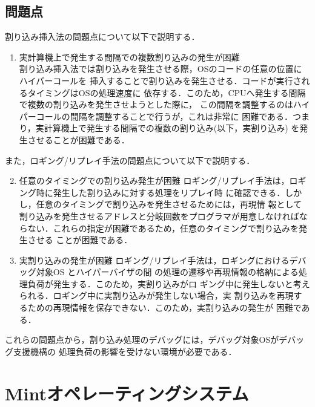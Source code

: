 \documentclass[tanilab-enum]{graduate}
\begin{document}
\section{問題点}
割り込み挿入法の問題点について以下で説明する．
\begin{enumerate}
    \item 実計算機上で発生する間隔での複数割り込みの発生が困難\\
        割り込み挿入法では割り込みを発生させる際，OSのコードの任意の位置にハイパーコールを
        挿入することで割り込みを発生させる．コードが実行されるタイミングはOSの処理速度に
        依存する．このため，CPUへ発生する間隔で複数の割り込みを発生させようとした際に，
        この間隔を調整するのはハイパーコールの間隔を調整することで行うが，これは非常に
        困難である．つまり，実計算機上で発生する間隔での複数の割り込み(以下，実割り込み)
        を発生させることが困難である．
\end{enumerate}
また，ロギング/リプレイ手法の問題点について以下で説明する．
\begin{enumerate}
\setcounter{enumi}{1}
    \item 任意のタイミングでの割り込み発生が困難
        ロギング/リプレイ手法は，ロギング時に発生した割り込みに対する処理をリプレイ時
        に確認できる．しかし，任意のタイミングで割り込みを発生させるためには，再現情
        報として割り込みを発生させるアドレスと分岐回数をプログラマが用意しなければな
        らない．これらの指定が困難であるため，任意のタイミングで割り込みを発生させる
        ことが困難である．
    \item 実割り込みの発生が困難
        ロギング/リプレイ手法は，ロギングにおけるデバッグ対象OS とハイパーバイザの間
        の処理の遷移や再現情報の格納による処理負荷が発生する．このため，実割り込みがロ
        ギング中に発生しないと考えられる．ロギング中に実割り込みが発生しない場合，実
        割り込みを再現するための再現情報を保存できない．このため，実割り込みの発生が
        困難である．
\end{enumerate}
これらの問題点から，割り込み処理のデバッグには，デバッグ対象OSがデバッグ支援機構の
処理負荷の影響を受けない環境が必要である．
\chapter{Mintオペレーティングシステム}\label{chap:Mint}
\end{document}
